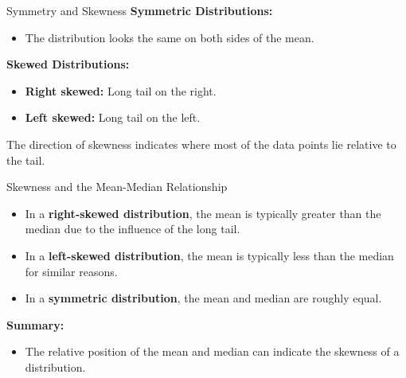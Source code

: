 \documentclass[handout]{beamer} %
\begin{document}
\begin{frame}{Symmetry and Skewness}
    \textbf{Symmetric Distributions:}
    \begin{itemize}
        \item The distribution looks the same on both sides of the mean.
    \end{itemize}
    
    \vspace{0.3cm}
    \textbf{Skewed Distributions:}
    \begin{itemize}
        \item \textbf{Right skewed:} Long tail on the right.
        \item \textbf{Left skewed:} Long tail on the left. 
    \end{itemize}
    
    \vspace{0.3cm}
    The direction of skewness indicates where most of the data points lie relative to the tail.
\end{frame}

\begin{frame}{Skewness and the Mean-Median Relationship}
    \begin{itemize}
        \item In a \textbf{right-skewed distribution}, the mean is typically greater than the median due to the influence of the long tail.
        \item In a \textbf{left-skewed distribution}, the mean is typically less than the median for similar reasons.
        \item In a \textbf{symmetric distribution}, the mean and median are roughly equal.
    \end{itemize}
    
    \vspace{0.5cm}
    \textbf{Summary:}
    \begin{itemize}
        \item The relative position of the mean and median can indicate the skewness of a distribution.
    \end{itemize}
\end{frame}
\end{document}

